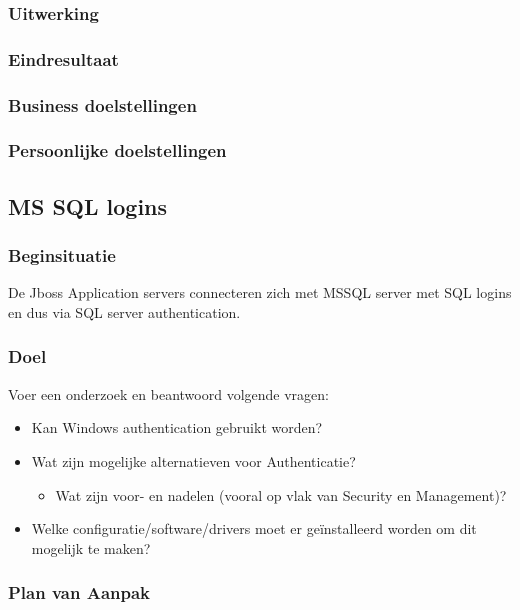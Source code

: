\subsubsection{Uitwerking}
\subsubsection{Eindresultaat}
\subsubsection{Business doelstellingen}
\subsubsection{Persoonlijke doelstellingen}

\subsection{MS SQL logins}

\subsubsection{Beginsituatie}

De Jboss Application servers connecteren zich met MSSQL server met SQL logins en dus via SQL server authentication.

\subsubsection{Doel}

Voer een onderzoek en beantwoord volgende vragen:

\begin{itemize}
    \item Kan Windows authentication gebruikt worden?
    \item Wat zijn mogelijke alternatieven voor Authenticatie?
    \begin{itemize}
        \item Wat zijn voor- en nadelen (vooral op vlak van Security en Management)?
    \end{itemize}
    \item Welke configuratie/software/drivers moet er geïnstalleerd worden om dit mogelijk te maken?
\end{itemize}

\subsubsection{Plan van Aanpak}

